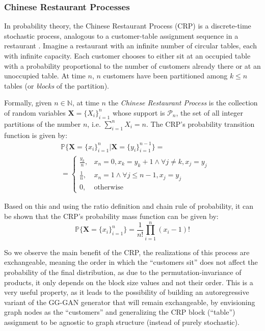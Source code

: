 \subsubsection{Chinese Restaurant Processes}
In probability theory, the Chinese Restaurant Process (CRP) is a discrete-time stochastic process, analogous to a customer-table assignment sequence in a restaurant \cite{aldous_exchangeability_1985}. Imagine a restaurant with an infinite number of circular tables, each with infinite capacity. Each customer chooses to either sit at an occupied table with a probability proportional to the number of customers already there or at an unoccupied table. At time $n$, $n$ customers have been partitioned among $k \leq n$ tables (or \emph{blocks} of the partition).

\begin{definition}
    Formally, given $n \in \mathbb{N}$, at time $n$ the \emph{Chinese Restaurant Process} is the collection of random variables $\pmb{X}=\{X_i\}_{i=1}^{n}$ whose support is $\mathcal{P}_n$, the set of all integer partitions of the number $n$, i.e. $\sum_{i=1}^{n}{X_i}=n$. The CRP's probability transition function is given by: 
\begin{align*}
&\mathbb{P}\{\pmb{X}=\{x_i\}_{i=1}^{n}|\pmb{X}=\{y_i\}_{i=1}^{n-1}\} = \\
&= \begin{cases} 
\frac{y_k}{n}, & x_n=0, x_k = y_k+1 \wedge \forall j \neq k, x_j=y_j \\
\frac{1}{n}, & x_n = 1 \wedge \forall j \leq n-1, x_j=y_j \\
0, & \text{otherwise} \end{cases}
\end{align*}
\end{definition}

Based on this and using the ratio definition and chain rule of probability, it can be shown that the CRP's probability mass function can be given by: 
$$\mathbb{P}\{\pmb{X}=\{x_i\}_{i=1}^{n}\} = \frac{1}{n!}\prod_{i=1}^{n}{(x_i - 1)!}$$

So we observe the main benefit of the CRP, the realizations of this process are exchangeable, meaning the order in which the \enquote{customers sit} does not affect the probability of the final distribution, as due to the permutation-invariance of products, it only depends on the block size values and not their order. This is a very useful property, as it leads to the possibility of building an autoregressive variant of the GG-GAN generator that will remain exchangeable, by envisioning graph nodes as the \enquote{customers} and generalizing the CRP block (\enquote{table}) assignment to be agnostic to graph structure (instead of purely stochastic).

